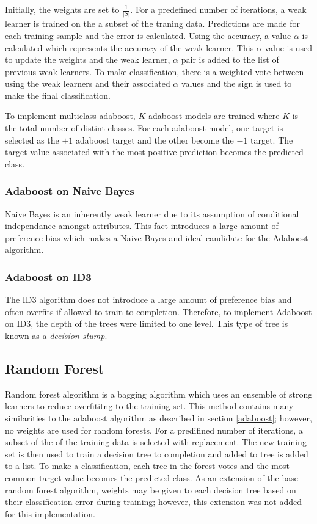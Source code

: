 \documentclass[11pt]{article}
\begin{document}
Initially, the weights are set to $\frac{1}{|S|}$. For a predefined number of iterations, a weak learner is trained on the a subset of the traning data. Predictions are made for each training sample and the error is calculated. Using the accuracy, a value $\alpha$ is calculated which represents the accuracy of the weak learner. This $\alpha$ value is used to update the weights and the weak learner, $\alpha$ pair is added to the list of previous weak learners. To make classification, there is a weighted vote between using the weak learners and their associated $\alpha$ values and the sign is used to make the final classification.

To implement multiclass adaboost, $K$ adaboost models are trained where $K$ is the total number of distint classes. For each adaboost model, one target is selected as the $+1$ adaboost target and the other become the $-1$ target. The target value associated with the most positive prediction becomes the predicted class.

\subsubsection{Adaboost on Naive Bayes}
Naive Bayes is an inherently weak learner due to its assumption of conditional independance amongst attributes. This fact introduces a large amount of preference bias which makes a Naive Bayes and ideal candidate for the Adaboost algorithm.

\subsubsection{Adaboost on ID3}
The ID3 algorithm does not introduce a large amount of preference bias and often overfits if allowed to train to completion. Therefore, to implement Adaboost on ID3, the depth of the trees were limited to one level. This type of tree is known as a \textit{decision stump}.

\subsection{Random Forest}
Random forest algorithm is a bagging algorithm which uses an ensemble of strong learners to reduce overfititng to the training set. This method contains many similarities to the adaboost algorithm as described in section \ref{adaboost}; however, no weights are used for random forests. For a predifined number of iterations, a subset of the of the training data is selected with replacement. The new training set is then used to train a decision tree to completion and added to tree is added to a list. To make a classification, each tree in the forest votes and the most common target value becomes the predicted class. As an extension of the base random forest algorithm, weights may be given to each decision tree based on their classification error during training; however, this extension was not added for this implementation.
\end{document}
